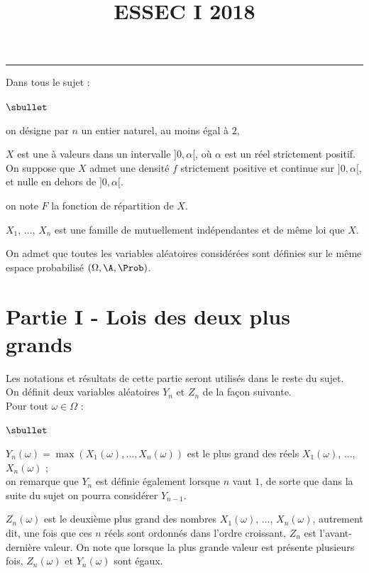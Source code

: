 \documentclass[11pt]{article}%
\title{\bf \vspace{-1.6cm} ESSEC I 2018} %
\author{} %
\date{} %
\begin{document}
\maketitle %
\vspace{-1.2cm}\hrule %
\thispagestyle{fancy}

\vspace*{.4cm}


\noindent
Dans tous le sujet :
\begin{noliste}{$\sbullet$}
\item on désigne par $n$ un entier naturel, au moins égal à $2$,
  
\item $X$ est une \var à valeurs dans un intervalle $]0,\alpha[$, où
  $\alpha$ est un réel strictement positif. On suppose que $X$ admet
  une densité $f$ strictement positive et continue sur $]0,\alpha[$,
  et nulle en dehors de $]0,\alpha[$.
  
\item on note $F$ la fonction de répartition de $X$.
  
\item $X_1$, $\ldots$, $X_n$ est une famille de \var mutuellement
  indépendantes et de même loi que $X$.
\end{noliste}
On admet que toutes les variables aléatoires considérées sont définies
sur le même espace probabilisé $(\Omega, \A, \Prob)$.


\section*{Partie I - Lois des deux plus grands}

\noindent
Les notations et résultats de cette partie seront utilisés dans le reste
du sujet.\\
On définit deux variables aléatoires $Y_n$ et $Z_n$ de la façon 
suivante.\\
Pour tout $\omega \in \Omega$ :
\begin{noliste}{$\sbullet$}
  \item $Y_n(\omega) = \max(X_1(\omega), \ldots, X_n(\omega))$ est le 
  plus grand des réels $X_1(\omega)$, $\ldots$, $X_n(\omega)$ ;\\
  on remarque que $Y_n$ est définie également lorsque $n$ vaut $1$, de 
  sorte que dans la suite du sujet on pourra considérer $Y_{n-1}$.
  
  \item $Z_n(\omega)$ est le \og deuxième plus grand \fg{} des nombres 
  $X_1(\omega)$, $\ldots$, $X_n(\omega)$, autrement dit, une fois que 
  ces $n$ réels sont ordonnés dans l'ordre croissant, $Z_n$ est 
  l'avant-dernière valeur. On note que lorsque la plus grande valeur 
  est présente plusieurs fois, $Z_n(\omega)$ et $Y_n(\omega)$ sont 
  égaux.
\end{noliste}
\end{document}
